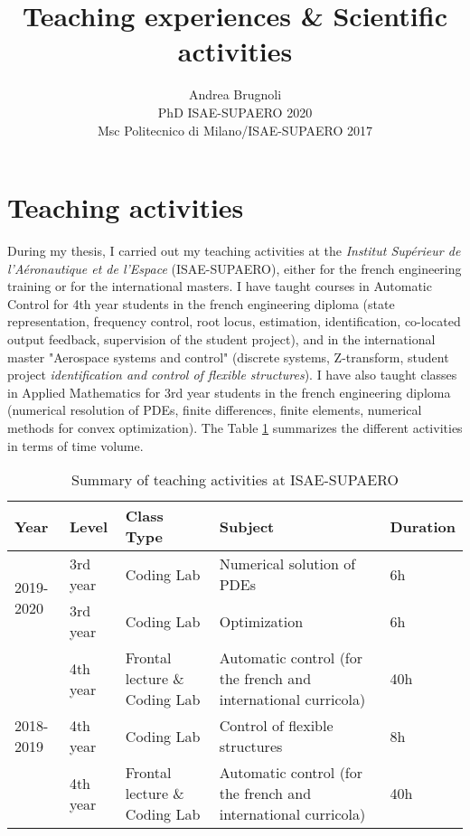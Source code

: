 \documentclass[12pt]{article}
\author{Andrea Brugnoli \\ 
	PhD ISAE-SUPAERO 2020\\
	Msc Politecnico di Milano/ISAE-SUPAERO 2017}
\title{Teaching experiences \& Scientific activities}
\date{}
\begin{document}
	
	\maketitle
	
	
	\thispagestyle{empty}
	
	\tableofcontents
	
	
	\section{Teaching activities}
	
	During my thesis, I carried out my teaching activities at the \textit{Institut Supérieur de l'Aéronautique et de l'Espace} (ISAE-SUPAERO), either for the french engineering training or for the international masters. I have taught courses in Automatic Control for 4th year students in the french engineering diploma (state representation, frequency control, root locus, estimation, identification, co-located output feedback, supervision of the student project), and in the international master "Aerospace systems and control" (discrete systems, Z-transform, student project \textit{identification and control of flexible structures}). I have also taught classes in Applied Mathematics for 3rd year students in the french engineering diploma (numerical resolution of PDEs, finite differences, finite elements, numerical methods for convex optimization). The Table \ref{tab:teaching} summarizes the different activities in terms of time volume.
	
	
	\begin{table}[h]
		\centering
		\begin{tabular}{p{}p{}p{}p{}p{}}
			\hline
			Year & Level & Class Type  & Subject & Duration  \\
			\hline
			\multirow{2}{*}{2019-2020} & 3rd year & Coding Lab &  Numerical solution of PDEs & 6h \\
			& 3rd year & Coding Lab &  Optimization & 6h \\
			\hline
			\multirow{3}{*}{2018-2019} & 4th year  & Frontal lecture \& Coding Lab & Automatic control (for the french and international curricola) & 40h \\
			& 4th year  & Coding Lab & Control of flexible structures & 8h \\
			\hline
			\multirow{2}{*}{2017-2018} & 4th year  & Frontal lecture \& Coding Lab & Automatic control (for the french and international curricola) & 40h \\			   
			\hline
		\end{tabular}
		\caption{Summary of teaching activities at ISAE-SUPAERO}
		\label{tab:teaching}
	\end{table}
	
\end{document}
